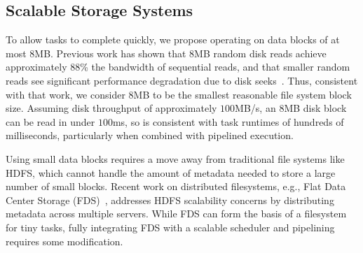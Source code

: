 \subsection{Scalable Storage Systems}
To allow tasks to complete quickly, we propose operating on data blocks of
at most $8$MB. Previous work has shown that $8$MB random disk reads achieve
approximately $88$\% the bandwidth of sequential reads, and that smaller random
reads see significant performance degradation due to disk
seeks~\cite{nightingale2012flat}. Thus, consistent with that work, we consider
$8$MB to be the smallest reasonable file system block size. Assuming disk
throughput of approximately $100$MB/s, an $8$MB disk block can be read in under
$100$ms, so is consistent with task runtimes of hundreds of milliseconds,
particularly when combined with pipelined execution.

Using small data blocks requires a move away from traditional file systems like
HDFS, which cannot handle the amount of metadata needed to store a large
number of small blocks.  Recent work on distributed filesystems, e.g., Flat
Data Center Storage (FDS)~\cite{nightingale2012flat}, addresses HDFS scalability
concerns by distributing metadata across multiple servers. While FDS can form
the basis of a filesystem for tiny tasks, fully integrating FDS with a scalable
scheduler and pipelining requires some modification.

